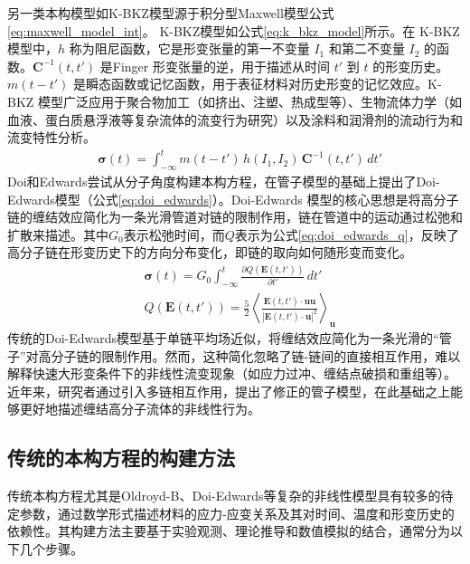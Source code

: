 另一类本构模型如K-BKZ模型源于积分型Maxwell模型公式\eqref{eq:maxwell_model_int}\cite{kaye1962non,bernstein1963study}。
K-BKZ模型如公式\eqref{eq:k_bkz_model}所示。在 K-BKZ 模型中，$h$ 称为阻尼函数，它是形变张量的第一不变量 $I_1$ 和第二不变量 $I_2$ 的函数。$\mathbf{C}^{-1}(t,t')$ 是Finger 形变张量的逆，用于描述从时间 $t'$ 到 $t$ 的形变历史。$m(t-t')$ 是瞬态函数或记忆函数，用于表征材料对历史形变的记忆效应。K-BKZ 模型广泛应用于聚合物加工（如挤出、注塑、热成型等）、生物流体力学（如血液、蛋白质悬浮液等复杂流体的流变行为研究）以及涂料和润滑剂的流动行为和流变特性分析\cite{mitsoulis60YearsKayeBernstein2023}。
\begin{align}
	 & \boldsymbol{\sigma}(t)  = \int_{-\infty}^t m(t-t') \, h(I_1, I_2) \, \mathbf{C}^{-1}(t,t') \, dt'    \label{eq:k_bkz_model}
\end{align}
Doi和Edwards尝试从分子角度构建本构方程，在管子模型的基础上提出了Doi-Edwards模型（公式\eqref{eq:doi_edwards}）。Doi-Edwards 模型的核心思想是将高分子链的缠结效应简化为一条光滑管道对链的限制作用，链在管道中的运动通过松弛和扩散来描述\cite{doi1978dynamics1,doi1978dynamics2,doi1978dynamics3,doi1979dynamics4}。其中$G_0$表示松弛时间，而$Q$表示为公式\eqref{eq:doi_edwards_q}，反映了高分子链在形变历史下的方向分布变化，即链的取向如何随形变而变化。
\begin{align}
	 & \boldsymbol{\sigma}(t)  = G_0 \int_{-\infty}^t \frac{\partial Q(\mathbf{E}(t,t'))}{\partial t'} \, dt'    \label{eq:doi_edwards}                                                                  \\
	 & Q(\mathbf{E}(t,t'))     = \frac{5}{2} \left\langle \frac{\mathbf{E}(t,t') \cdot \mathbf{u} \mathbf{u}}{|\mathbf{E}(t,t') \cdot \mathbf{u}|^2} \right\rangle_{\mathbf{u}} \label{eq:doi_edwards_q}
\end{align}
传统的Doi-Edwards模型基于单链平均场近似，将缠结效应简化为一条光滑的“管子”对高分子链的限制作用。然而，这种简化忽略了链-链间的直接相互作用，难以解释快速大形变条件下的非线性流变现象（如应力过冲、缠结点破损和重组等）。近年来，研究者通过引入多链相互作用，提出了修正的管子模型，在此基础之上能够更好地描述缠结高分子流体的非线性行为\cite{OConnor1992ConfirmationOT,hassager2010constitutive,chupin2017mathematical}。

\subsection{传统的本构方程的构建方法}
传统本构方程尤其是Oldroyd-B、Doi-Edwards等复杂的非线性模型具有较多的待定参数，通过数学形式描述材料的应力-应变关系及其对时间、温度和形变历史的依赖性。其构建方法主要基于实验观测、理论推导和数值模拟的结合，通常分为以下几个步骤。

